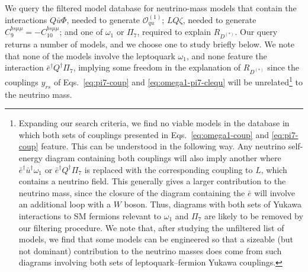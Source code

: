 We query the filtered model database for neutrino-mass models that contain the
interactions $Q \bar{u} \Phi$, needed to generate $\mathcal{O}_{qu}^{(1)}$;
$LQ\zeta$, needed to generate $C_{9}^{bs\mu\mu} = -C_{10}^{bs\mu\mu}$; and one
of $\omega_{1}$ or $\Pi_{7}$, required to explain $R_{D^{(*)}}$. Our query
returns a number of models, and we choose one to study briefly below. We note
that none of the models involve the leptoquark $\omega_{1}$, and none feature
the interaction $\bar{e}^{\dagger} Q^{\dagger} \Pi_{7}$, implying some freedom
in the explanation of $R_{D^{(*)}}$ since the couplings $y_{rs}$ of
Eqs.~\eqref{eq:pi7-coup} and \eqref{eq:omega1-pi7-clequ} will be
unrelated\footnote{Expanding our search criteria, we find no viable models in
  the database in which both sets of couplings presented in
  Eqs.~\eqref{eq:omega1-coup} and \eqref{eq:pi7-coup} feature. This can be
  understood in the following way. Any neutrino self-energy diagram containing
  both couplings will also imply another where
  $\bar{e}^{\dagger} \bar{u}^\dagger \omega_{1}$ or
  $\bar{e}^{\dagger} Q^{\dagger} \Pi_{7}$ is replaced with the corresponding
  coupling to $L$, which contains a neutrino field. This generally gives a
  larger contribution to the neutrino mass, since the closure of the diagram
  containing the $\bar{e}$ will involve an additional loop with a $W$ boson.
  Thus, diagrams with both sets of Yukawa interactions to SM fermions relevant
  to $\omega_{1}$ and $\Pi_{7}$ are likely to be removed by our filtering
  procedure. We note that, after studying the unfiltered list of models, we find
  that some models can be engineered so that a sizeable (but not dominant)
  contribution to the neutrino masses does come from such diagrams involving
  both sets of leptoquark--fermion Yukawa couplings.} to the neutrino mass.

